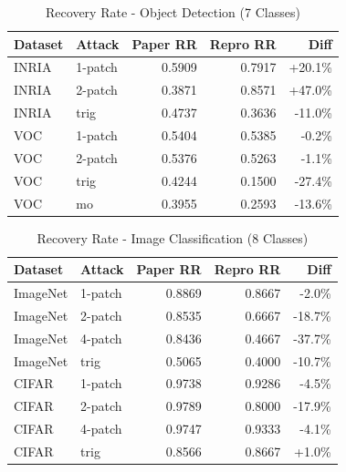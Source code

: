 \begin{table}[htbp]
\centering
\caption{Recovery Rate - Object Detection (7 Classes)}
\label{tab:recovery_rate_detection}
\begin{tabular}{llrrr}
\toprule
Dataset & Attack & Paper RR & Repro RR & Diff \\
\midrule
INRIA & 1-patch & 0.5909 & 0.7917 & +20.1\% \\
INRIA & 2-patch & 0.3871 & 0.8571 & +47.0\% \\
INRIA & trig & 0.4737 & 0.3636 & -11.0\% \\
\midrule
VOC & 1-patch & 0.5404 & 0.5385 & -0.2\% \\
VOC & 2-patch & 0.5376 & 0.5263 & -1.1\% \\
VOC & trig & 0.4244 & 0.1500 & -27.4\% \\
VOC & mo & 0.3955 & 0.2593 & -13.6\% \\
\bottomrule
\end{tabular}
\end{table}


\begin{table}[htbp]
\centering
\caption{Recovery Rate - Image Classification (8 Classes)}
\label{tab:recovery_rate_classification}
\begin{tabular}{llrrr}
\toprule
Dataset & Attack & Paper RR & Repro RR & Diff \\
\midrule
ImageNet & 1-patch & 0.8869 & 0.8667 & -2.0\% \\
ImageNet & 2-patch & 0.8535 & 0.6667 & -18.7\% \\
ImageNet & 4-patch & 0.8436 & 0.4667 & -37.7\% \\
ImageNet & trig & 0.5065 & 0.4000 & -10.7\% \\
\midrule
CIFAR & 1-patch & 0.9738 & 0.9286 & -4.5\% \\
CIFAR & 2-patch & 0.9789 & 0.8000 & -17.9\% \\
CIFAR & 4-patch & 0.9747 & 0.9333 & -4.1\% \\
CIFAR & trig & 0.8566 & 0.8667 & +1.0\% \\
\bottomrule
\end{tabular}
\end{table}



